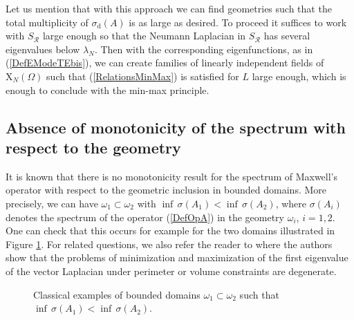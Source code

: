 \documentclass[11pt,a4paper]{article}
\newcommand{\om}{\omega}
\newcommand{\Om}{\Omega}
\newcommand{\mrm}[1]{\mathrm{#1}}
\newcommand{\mX}{\mrm{X}}
\begin{document}
\noindent Let us mention that with this approach we can find geometries such that the total multiplicity of $\sigma_{\mrm{d}}(A)$ is as large as desired. To proceed it suffices to work with $S_{\mathcal{R}}$ large enough so that the Neumann Laplacian in $S_{\mathcal{R}}$ has several eigenvalues below $\lambda_N$. Then with the corresponding eigenfunctions, as in (\ref{DefEModeTEbis}), we can create families of linearly independent fields of $\boldsymbol{\mX}_N(\Om)$ such that (\ref{RelationsMinMax}) is satisfied for $L$ large enough, which is enough to conclude with the min-max principle.



\subsection{Absence of monotonicity of the spectrum with respect to the geometry}\label{AbsenceOfMono}





It is known that there is no monotonicity result for the spectrum of Maxwell's operator with respect to the geometric inclusion in bounded domains. More precisely, we can have $\om_1\subset\om_2$ with $\inf\,\sigma(A_1)<\inf\,\sigma(A_2)$, where $\sigma(A_i)$ denotes the spectrum of the operator (\ref{DefOpA}) in the geometry $\om_i$, $i=1,2$. One can check that this occurs for example for the two domains illustrated in Figure \ref{NoMinMaxBounded}. For related questions, we also refer the reader to \cite{KrLZ25} where the authors show that the problems of minimization and maximization of the first eigenvalue of the vector Laplacian under perimeter or volume constraints are degenerate. 

\begin{figure}[!ht]
\centering
{}
\caption{Classical examples of bounded domains $\om_1\subset\om_2$ such that $\inf\,\sigma(A_1)<\inf\,\sigma(A_2)$.\label{NoMinMaxBounded}}
\end{figure}
\end{document}
